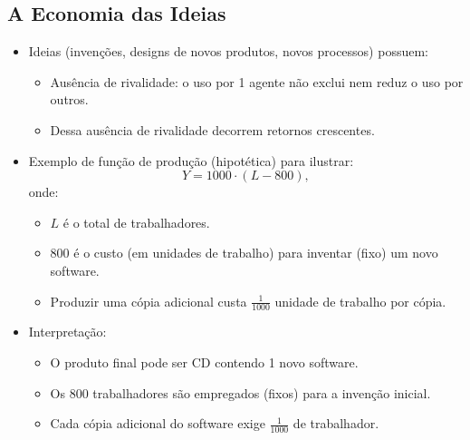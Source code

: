 \documentclass[a4paper,12pt]{article}[abntex2]
\begin{document}
\subsection{\textbf{A Economia das Ideias}}
\begin{itemize}
    \item Ideias (invenções, designs de novos produtos, novos processos) possuem:
          \begin{itemize}
              \item Ausência de rivalidade: o uso por 1 agente não exclui nem reduz o uso por outros.
              \item Dessa ausência de rivalidade decorrem retornos crescentes.
          \end{itemize}

    \item Exemplo de função de produção (hipotética) para ilustrar:
    \[
      Y = 1000 \cdot (L - 800),
    \]
    onde:
    \begin{itemize}
      \item $L$ é o total de trabalhadores.
      \item 800 é o custo (em unidades de trabalho) para inventar (fixo) um novo software.
      \item Produzir uma cópia adicional custa 
            $\tfrac{1}{1000}$ unidade de trabalho por cópia.
    \end{itemize}

    \item Interpretação:
    \begin{itemize}
      \item O produto final pode ser CD contendo 1 novo software.
      \item Os 800 trabalhadores são empregados (fixos) para a invenção inicial.
      \item Cada cópia adicional do software exige $\frac{1}{1000}$ de trabalhador.
    \end{itemize}
\end{itemize}
\end{document}
